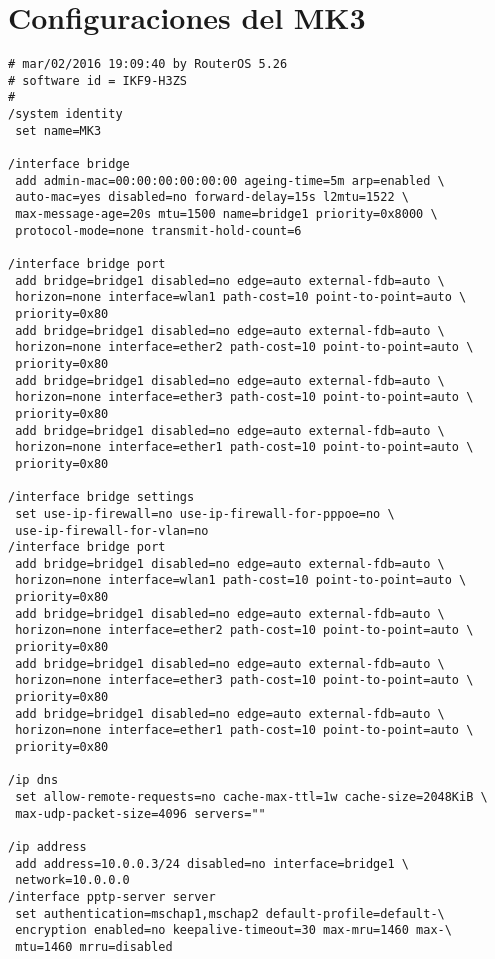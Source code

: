 \section{Configuraciones del MK3}
\begin{verbatim}
# mar/02/2016 19:09:40 by RouterOS 5.26
# software id = IKF9-H3ZS
#
/system identity
 set name=MK3

/interface bridge
 add admin-mac=00:00:00:00:00:00 ageing-time=5m arp=enabled \
 auto-mac=yes disabled=no forward-delay=15s l2mtu=1522 \
 max-message-age=20s mtu=1500 name=bridge1 priority=0x8000 \
 protocol-mode=none transmit-hold-count=6
 
/interface bridge port
 add bridge=bridge1 disabled=no edge=auto external-fdb=auto \
 horizon=none interface=wlan1 path-cost=10 point-to-point=auto \
 priority=0x80
 add bridge=bridge1 disabled=no edge=auto external-fdb=auto \
 horizon=none interface=ether2 path-cost=10 point-to-point=auto \
 priority=0x80
 add bridge=bridge1 disabled=no edge=auto external-fdb=auto \
 horizon=none interface=ether3 path-cost=10 point-to-point=auto \
 priority=0x80
 add bridge=bridge1 disabled=no edge=auto external-fdb=auto \
 horizon=none interface=ether1 path-cost=10 point-to-point=auto \
 priority=0x80
 
/interface bridge settings
 set use-ip-firewall=no use-ip-firewall-for-pppoe=no \ 
 use-ip-firewall-for-vlan=no
/interface bridge port
 add bridge=bridge1 disabled=no edge=auto external-fdb=auto \
 horizon=none interface=wlan1 path-cost=10 point-to-point=auto \
 priority=0x80
 add bridge=bridge1 disabled=no edge=auto external-fdb=auto \
 horizon=none interface=ether2 path-cost=10 point-to-point=auto \
 priority=0x80
 add bridge=bridge1 disabled=no edge=auto external-fdb=auto \
 horizon=none interface=ether3 path-cost=10 point-to-point=auto \
 priority=0x80 
 add bridge=bridge1 disabled=no edge=auto external-fdb=auto \
 horizon=none interface=ether1 path-cost=10 point-to-point=auto \
 priority=0x80
 
/ip dns
 set allow-remote-requests=no cache-max-ttl=1w cache-size=2048KiB \
 max-udp-packet-size=4096 servers=""

/ip address
 add address=10.0.0.3/24 disabled=no interface=bridge1 \
 network=10.0.0.0
/interface pptp-server server
 set authentication=mschap1,mschap2 default-profile=default-\
 encryption enabled=no keepalive-timeout=30 max-mru=1460 max-\
 mtu=1460 mrru=disabled
 

\end{verbatim}
